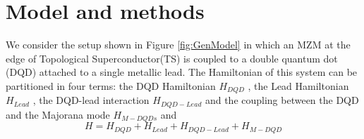 \documentclass[showpacs,aps,prb,reprint,superscriptaddress]{revtex4-1}
\newcommand{\TS}[1]{{$\rightarrow$ {\sl#1}}}
\newcommand{\LUIS}[1]{\textcolor{blue}{\fbox{Luis} {\sl#1}}}
\begin{document}




\section{Model and methods}
\label{sec:modelmethods}


We consider the setup shown in Figure \ref{fig:GenModel} in which an MZM at the edge of Topological Superconductor(TS) is coupled to a double quantum dot (DQD) attached to a single metallic lead. The Hamiltonian of this system can be partitioned in four terms: the DQD Hamiltonian $H_{DQD}$ , the Lead Hamiltonian $H_{Lead}$ , the DQD-lead interaction  $H_{DQD-Lead}$ and the coupling between the DQD and the Majorana mode $H_{M-DQDs}$ and   
\begin{equation}
H=H_{DQD}+H_{Lead}+H_{DQD-Lead}+H_{M-DQD} 
\label{eq:Model}
\end{equation}
\end{document}
